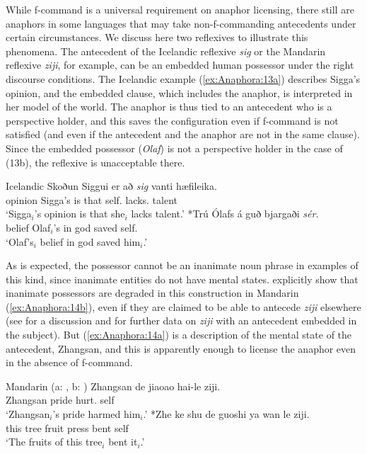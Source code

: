 \documentclass[output=paper,hidelinks]{langscibook}
\begin{document}
While f-command is a universal requirement on anaphor licensing, there still are anaphors in some languages that may take non-f-commanding antecedents under certain circumstances. We discuss here two reflexives to illustrate this phenomena. The antecedent of the Icelandic reflexive \emph{sig} or the Mandarin reflexive \emph{ziji}, for example, can be an embedded human possessor under the right discourse conditions. The Icelandic example (\ref{ex:Anaphora:13a}) describes Sigga's opinion, and the embedded clause, which includes the anaphor, is interpreted in her model of the world. The anaphor is thus tied to an antecedent who is a perspective holder, and this saves the configuration even if f-command is not satisfied (and even if the antecedent and the anaphor are not in the same clause). Since the embedded possessor (\emph{Olaf}\/) is not a perspective holder in the case of (13b), the reflexive is unacceptable there.

\ea\label{ex:Anaphora:13} Icelandic \citep[220--222]{Maling84}
\ea\label{ex:Anaphora:13a}\gll
 Skoðun Siggui er  að   \emph{sig}  vanti   hæfileika.\\
 opinion Sigga's is  that self.{\ACC}  lacks.{\SBJV}  talent\\
 \glt`Sigga$_i$'s opinion is that she$_i$ lacks talent.' 
\ex\label{ex:Anaphora:13b}\gll
 *Trú  Ólafs á guð  bjargaði  \emph{sér}.\\
 belief Olaf$_i$'s in god saved  self.\DAT\\
 \glt`Olaf's$_i$ belief in god saved him$_i$.'
\z\z

\noindent As is expected, the possessor cannot be an inanimate noun phrase in examples of this kind, since inanimate entities do not have mental states. \citet{Charnavel2018-qa} explicitly show that inanimate possessors are degraded in this construction in Mandarin (\ref{ex:Anaphora:14b}), even if they are claimed to be able to antecede \emph{ziji} elsewhere (see \citealt{Lam2021-rq} for a discussion and for further data on \emph{ziji} with an antecedent embedded in the subject). But (\ref{ex:Anaphora:14a}) is a description of the mental state of the antecedent, Zhangsan, and this is apparently enough to license the anaphor even in the absence of f-command.

\ea\label{ex:Anaphora:14} Mandarin (a: \citealt[100]{10.2307/4047781}, b: \citealt[140]{Charnavel2018-qa})
\ea\label{ex:Anaphora:14a}\gll
 Zhangsan de jiaoao  hai-le   ziji.\\
 Zhangsan  pride   hurt.{\ASP} self\\
 \glt`Zhangsan$_i$'s pride harmed him$_i$.'
\ex\label{ex:Anaphora:14b}\gll
*Zhe ke shu de guoshi  ya  wan le  ziji.\\
 this  tree  fruit   press  bent  {\ASP}  self\\
 \glt`The fruits of this tree$_i$ bent it$_i$.'
\z\z
\end{document}
